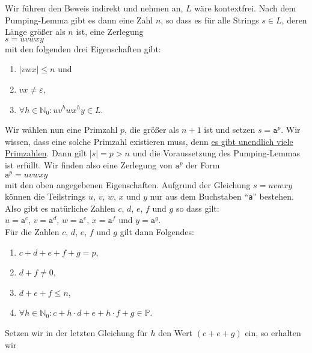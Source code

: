 \solution
Wir f\"uhren den Beweis indirekt und nehmen an, $L$ w\"are kontextfrei.  Nach
dem Pumping-Lemma gibt es dann eine Zahl $n$, so dass es f\"ur alle Strings $s \in L$, 
deren L\"ange gr\"o{\ss}er als $n$ ist, eine Zerlegung
\\[0.2cm]
\hspace*{1.3cm}
$s = uvwxy$
\\[0.2cm]
mit den folgenden drei Eigenschaften gibt:
\begin{enumerate}
\item $|vwx| \leq n$ \quad und
\item $vx \not= \varepsilon$, 
\item $\forall h \in \mathbb{N}_0: u v^h w x^h y \in L$.
\end{enumerate}
Wir w\"ahlen nun eine Primzahl $p$, die gr\"o{\ss}er als $n+1$ ist und setzen $s = \mathtt{a}^p$.
Wir wissen, dass eine solche Primzahl existieren muss, denn 
\href{http://en.wikipedia.org/wiki/Prime_number#Number_of_prime_numbers}{es gibt unendlich viele Primzahlen}. 
Dann gilt $|s| = p > n$ und die Voraussetzung des Pumping-Lemmas ist erf\"ullt.
Wir finden also eine Zerlegung von $\mathtt{a}^p$ der Form
\\[0.2cm]
\hspace*{1.3cm}
$\mathtt{a}^p = uvwxy$ 
\\[0.2cm]
mit den oben angegebenen Eigenschaften.
Aufgrund der Gleichung $s = uvwxy$ k\"onnen die Teilstrings $u$, $v$, $w$, $x$ und $y$ nur aus dem
Buchstaben ``\texttt{a}'' bestehen.  Also gibt es nat\"urliche Zahlen $c$, $d$, $e$, $f$ und
$g$ so dass gilt:
\\[0.2cm]
\hspace*{1.3cm}
$u = \mathtt{a}^c$, \quad $v = \mathtt{a}^d$, \quad $w = \mathtt{a}^e$, \quad 
$x = \mathtt{a}^f$ \quad und \quad $y = \mathtt{a}^g$.
\\[0.2cm]
F\"ur die Zahlen $c$, $d$, $e$, $f$ und $g$ gilt dann Folgendes:
\begin{enumerate}
\item $c + d + e + f + g = p$,
\item $d + f \not= 0$,
\item $d + e + f \leq n$,
\item $\forall h \in \mathbb{N}_0: c + h \cdot d + e + h \cdot f + g \in \mathbb{P}$.
\end{enumerate}
Setzen wir in der letzten Gleichung f\"ur $h$ den Wert $(c + e + g)$ ein, so erhalten wir
\\[0.2cm]
\hspace*{1.3cm}
